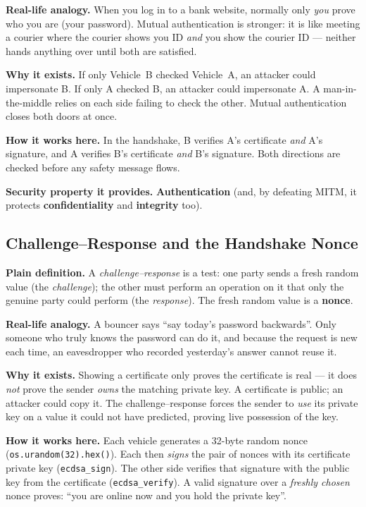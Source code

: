 \documentclass[11pt,a4paper]{article}
\begin{document}
\textbf{Real-life analogy.} When you log in to a bank website, normally only
\emph{you} prove who you are (your password). Mutual authentication is stronger:
it is like meeting a courier where the courier shows you ID \emph{and} you show
the courier ID --- neither hands anything over until both are satisfied.

\textbf{Why it exists.} If only Vehicle~B checked Vehicle~A, an attacker could
impersonate B. If only A checked B, an attacker could impersonate A. A
man-in-the-middle relies on each side failing to check the other. Mutual
authentication closes both doors at once.

\textbf{How it works here.} In the handshake, B verifies A's certificate
\emph{and} A's signature, and A verifies B's certificate \emph{and} B's
signature. Both directions are checked before any safety message flows.

\textbf{Security property it provides.} \textbf{Authentication} (and, by
defeating MITM, it protects \textbf{confidentiality} and \textbf{integrity} too).

\subsection{Challenge--Response and the Handshake Nonce}
\textbf{Plain definition.} A \emph{challenge--response} is a test: one party
sends a fresh random value (the \emph{challenge}); the other must perform an
operation on it that only the genuine party could perform (the \emph{response}).
The fresh random value is a \textbf{nonce}.

\textbf{Real-life analogy.} A bouncer says ``say today's password backwards''.
Only someone who truly knows the password can do it, and because the request is
new each time, an eavesdropper who recorded yesterday's answer cannot reuse it.

\textbf{Why it exists.} Showing a certificate only proves the certificate is
real --- it does \emph{not} prove the sender \emph{owns} the matching private
key. A certificate is public; an attacker could copy it. The challenge--response
forces the sender to \emph{use} its private key on a value it could not have
predicted, proving live possession of the key.

\textbf{How it works here.} Each vehicle generates a 32-byte random nonce
(\texttt{os.urandom(32).hex()}). Each then \emph{signs} the pair of nonces with
its certificate private key (\texttt{ecdsa\_sign}). The other side verifies that
signature with the public key from the certificate (\texttt{ecdsa\_verify}). A
valid signature over a \emph{freshly chosen} nonce proves: ``you are online now
and you hold the private key''.
\end{document}
